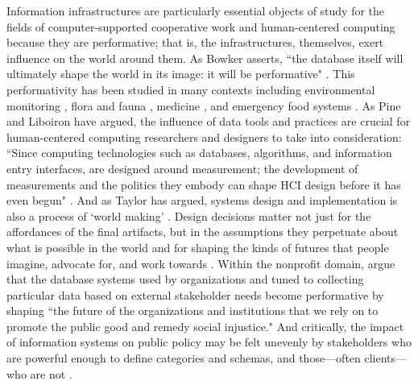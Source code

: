 Information infrastructures are particularly essential objects of study for the fields of computer-supported cooperative work and human-centered computing because they are performative; that is, the infrastructures, themselves, exert influence on the world around them. As Bowker asserts, ``the database itself will ultimately shape the world in its image: it will be performative" \citep{Bowker2000Bio}. This performativity has been studied in many contexts including environmental monitoring \citep{Ribes2013DataBite}, flora and fauna \citep{Bowker2000Bio}, medicine \citep{Pine2015Politics}, and emergency food systems \citep{Voida2017Currencies}. As Pine and Liboiron have argued, the influence of data tools and practices are crucial for human-centered computing researchers and designers to take into consideration: ``Since computing technologies such as databases, algorithms, and information entry interfaces, are designed around measurement; the development of measurements and the politics they embody can shape HCI design before it has even begun" \citep{Pine2015Politics}. And as Taylor has argued, systems design and implementation is also a process of `world making' \citep{Taylor2015AfterInt}. Design decisions matter not just for the affordances of the final artifacts, but in the assumptions they perpetuate about what is possible in the world and for shaping the kinds of futures that people imagine, advocate for, and work towards \citep{Taylor2015AfterInt}. Within the nonprofit domain, \citet{Voida2017Currencies} argue that the database systems used by organizations and tuned to collecting particular data based on external stakeholder needs become performative by shaping ``the future of the organizations and institutions that we rely on to promote the public good and remedy social injustice." And critically, the impact of information systems on public policy may be felt unevenly by stakeholders who are powerful enough to define categories and schemas, and those---often clients---who are not \citep{Bowker2000Sorting,Star1996Ecology}. 


